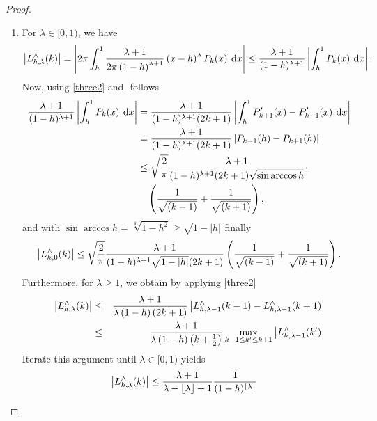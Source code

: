\begin{proof}
  \begin{enumerate}
  \item For $\lambda \in [0,1)$, we have
    \begin{equation*}
      \left|L_{h,\lambda}^{\wedge}{\hspace{-0.4ex}}\left(k\right)\right| 
      = \left\vert2\pi \int_{h}^1 \frac{\lambda+1}{2\pi\left(1-h\right)^{\lambda+1}} 
        \left(x-h\right)^{\lambda} P_{k}{\hspace{-0.4ex}}\left(x\right) \: \text{\rm{d}} x\right\vert 
      \le \frac{\lambda+1}{(1-h)^{\lambda+1}}\left\vert\int_{h}^1 P_{k}{\hspace{-0.4ex}}\left(x\right) \: \text{\rm{d}} x\right\vert.
    \end{equation*}
    Now, using \eqref{three2} and ${}$ follows
    \begin{align*}
      \frac{\lambda+1}{(1-h)^{\lambda+1}}\left\vert\int_{h}^1 P_{k}{\hspace{-0.4ex}}\left(x\right) \: \text{\rm{d}} x\right\vert
      & = \frac{\lambda+1}{(1-h)^{\lambda+1}(2k+1)}
          \left\vert\int_{h}^1 P_{k+1}'{\hspace{-0.4ex}}\left(x\right) - P_{k-1}'{\hspace{-0.4ex}}\left(x\right) \: \text{\rm{d}} x\right\vert\\
      & = \frac{\lambda+1}{(1-h)^{\lambda+1}(2k+1)}
          \left\vert P_{k-1}{\hspace{-0.4ex}}\left(h\right) - P_{k+1}{\hspace{-0.4ex}}\left(h\right)\right\vert\\
      & \le \sqrt{\frac{2}{\pi}}\frac{\lambda+1}{(1-h)^{\lambda+1}(2k+1)
            \sqrt{\sin\arccos h}} \cdot \\
      & \quad \left(\frac{1}{\sqrt{(k-1)}} + \frac{1}{\sqrt{(k+1)}}\right),
    \end{align*}
    and with $\sin\arccos h = \sqrt[4]{1-h^2} \ge \sqrt{1-|h|}$ finally
    \begin{equation}
      \label{SmallLambda}
      \left|L_{h,0}^{\wedge}{\hspace{-0.4ex}}\left(k\right)\right| \le 
      \sqrt{\frac{2}{\pi}}\frac{\lambda+1}{(1-h)^{\lambda+1}\sqrt{1-|h|}(2k+1)}
      \left(\frac{1}{\sqrt{(k-1)}} + \frac{1}{\sqrt{(k+1)}}\right).
    \end{equation}
    Furthermore, for $\lambda \ge 1$, we obtain by applying \eqref{three2}
    \begin{eqnarray*}
      \left|L_{h,\lambda}^{\wedge}{\hspace{-0.4ex}}\left(k\right)\right| &\le&
      \frac{\lambda+1}{\lambda\left(1-h\right)\left(2k+1\right)}
      \left|L_{h,\lambda-1}^{\wedge}{\hspace{-0.4ex}}\left(k-1\right)-
        L_{h,\lambda-1}^{\wedge}{\hspace{-0.4ex}}\left(k+1\right)\right|\\ &\le&
      \frac{\lambda+1}{\lambda\left(1-h\right)\left(k+\frac{1}{2}\right)}
      \max\limits_{k-1\le k'\le k+1}
      \left|L_{h,\lambda-1}^{\wedge}{\hspace{-0.4ex}}\left(k'\right)\right|
    \end{eqnarray*}
    Iterate this argument until $\lambda \in [0,1)$ yields
    \begin{align*}
      \left|\fun{L_{h,\lambda}^{\wedge}}{k}\right|
      & \le \frac{\lambda+1}{\lambda-\floor{\lambda}+1} \frac{1}{(1-h)^{\floor{\lambda}}}

\end{align*}
\end{enumerate}
\end{proof}
